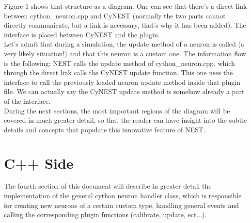 \documentclass{article}
\begin{document}
Figure 1 shows that structure as a diagram. One can see that there's a direct link between cython\_neuron.cpp and CyNEST (normally the two parts cannot directly communicate, but a link is necessary, that's why it has been added). The interface is placed between CyNEST and the plugin. \\
Let's admit that during a simulation, the update method of a neuron is called (a very likely situation!) and that this neuron is a custom one. The information flow is the following: NEST calls the update method of cython\_neuron.cpp, which through the direct link calls the CyNEST update function. This one uses the interface to call the previously loaded neuron update method inside that plugin file. We can actually say the CyNEST update method is somehow already a part of the interface.\\
During the next sections, the most important regions of the diagram will be covered in much greater detail, so that the reader can have insight into the subtle details and concepts that populate this innovative feature of NEST.

\section{C++ Side}
The fourth section of this document will describe in greater detail the implementation of the general cython neuron handler class, which is responsible for creating new neurons of a certain custom type, handling general events and calling the corresponding plugin functions (calibrate, update, ect...).
\end{document}
